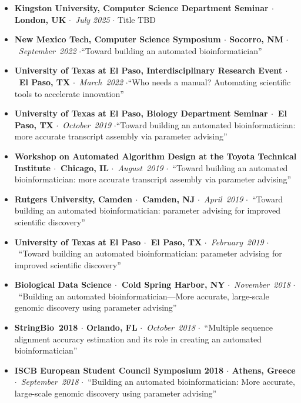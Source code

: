 \documentclass[10pt,letterpaper]{article}
\newcommand{\bigdot}{$\cdot$\xspace}
\begin{document}
\begin{itemize}[leftmargin=*,labelindent=5pt,itemindent=-15pt]
  \item \textbf{Kingston University, Computer Science Department Seminar \bigdot London, UK} \bigdot~\textit{July 2025} \bigdot Title TBD
  \item \textbf{New Mexico Tech, Computer Science Symposium \bigdot Socorro, NM} \bigdot~\textit{September~2022} \bigdot ``Toward building an automated bioinformatician''
  \item \textbf{University of Texas at El Paso, Interdisciplinary Research Event \bigdot~El Paso, TX} \bigdot~\textit{March~2022} \bigdot ``Who needs a manual? Automating scientific tools to accelerate innovation''
  \item \textbf{University of Texas at El Paso, Biology Department Seminar \bigdot~El Paso, TX} \bigdot~\textit{October~2019} \bigdot ``Toward building an automated bioinformatician: more accurate transcript assembly via parameter advising''
  \item \textbf{Workshop on Automated Algorithm Design at the Toyota Technical Institute \bigdot~Chicago, IL} \bigdot~\textit{August~2019} \bigdot~``Toward building an automated bioinformatician: more accurate transcript assembly via parameter advising''
  \item \textbf{Rutgers University, Camden \bigdot~Camden, NJ} \bigdot~\textit{April~2019} \bigdot~``Toward building an automated bioinformatician: 
parameter advising for improved scientific discovery''
  \item \textbf{University of Texas at El Paso \bigdot~El Paso, TX} \bigdot~\textit{February~2019} \bigdot~``Toward building an automated bioinformatician: 
parameter advising for improved scientific discovery''
  \item \textbf{Biological Data Science \bigdot~Cold Spring Harbor, NY} \bigdot~\textit{November~2018} \bigdot~``Building an automated bioinformatician---More accurate, large-scale genomic discovery using parameter advising'' 
   \item \textbf{StringBio~2018 \bigdot Orlando, FL} \bigdot~\textit{October~2018} \bigdot~``Multiple sequence alignment accuracy estimation and its role in creating an automated bioinformatician'' 
   \item \textbf{ISCB European Student Council Symposium 2018 \bigdot Athens, Greece} \bigdot~\textit{September~2018} \bigdot~``Building an automated bioinformatician: More accurate, large-scale genomic discovery using parameter advising''

\end{itemize}
\end{document}
